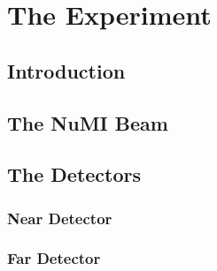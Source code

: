 \chapter{The \nova Experiment}

\section{Introduction}

\section{The NuMI Beam}

\section{The \nova Detectors}

\subsection{Near Detector}

\subsection{Far Detector}